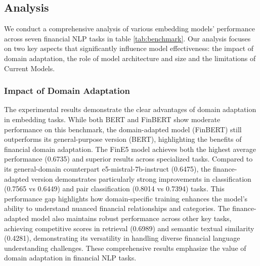\subsection{Analysis}


We conduct a comprehensive analysis of various embedding models' performance across seven financial NLP tasks in table \ref{tab:benchmark}. 
Our analysis focuses on two key aspects that significantly influence model effectiveness: the impact of domain adaptation, the role of model architecture and size and the limitations of Current Models.

\subsubsection{Impact of Domain Adaptation}

The experimental results demonstrate the clear advantages of domain adaptation in embedding tasks. While both BERT and FinBERT show moderate performance on this benchmark, the domain-adapted model (FinBERT) still outperforms its general-purpose version (BERT), highlighting the benefits of financial domain adaptation. The FinE5 model achieves both the highest average performance (0.6735) and superior results across specialized tasks. Compared to its general-domain counterpart e5-mistral-7b-instruct (0.6475), the finance-adapted version demonstrates particularly strong improvements in classification (0.7565 vs 0.6449) and pair classification (0.8014 vs 0.7394) tasks. This performance gap highlights how domain-specific training enhances the model's ability to understand nuanced financial relationships and categories. The finance-adapted model also maintains robust performance across other key tasks, achieving competitive scores in retrieval (0.6989) and semantic textual similarity (0.4281), demonstrating its versatility in handling diverse financial language understanding challenges. These comprehensive results emphasize the value of domain adaptation in financial NLP tasks.



